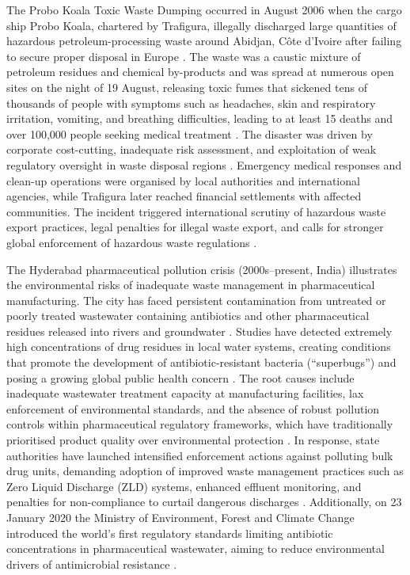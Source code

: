 The Probo Koala Toxic Waste Dumping occurred in August 2006 when the cargo ship Probo Koala, chartered by Trafigura, illegally discharged large quantities of hazardous petroleum-processing waste around Abidjan, C\^{o}te d'Ivoire after failing to secure proper disposal in Europe \cite{Amnesty_Trafigura}. The waste was a caustic mixture of petroleum residues and chemical by-products and was spread at numerous open sites on the night of 19 August, releasing toxic fumes that sickened tens of thousands of people with symptoms such as headaches, skin and respiratory irritation, vomiting, and breathing difficulties, leading to at least 15 deaths and over 100,000 people seeking medical treatment \cite{BBC_Trafigura, Amnesty_Trafigura}. The disaster was driven by corporate cost-cutting, inadequate risk assessment, and exploitation of weak regulatory oversight in waste disposal regions \cite{Amnesty_Trafigura, DOJ_EOIR}. Emergency medical responses and clean-up operations were organised by local authorities and international agencies, while Trafigura later reached financial settlements with affected communities. The incident triggered international scrutiny of hazardous waste export practices, legal penalties for illegal waste export, and calls for stronger global enforcement of hazardous waste regulations \cite{Amnesty_Trafigura, DOJ_EOIR}.

The Hyderabad pharmaceutical pollution crisis (2000s--present, India) illustrates the environmental risks of inadequate waste management in pharmaceutical manufacturing. The city has faced persistent contamination from untreated or poorly treated wastewater containing antibiotics and other pharmaceutical residues released into rivers and groundwater \cite{Nordea_Hyderabad}. Studies have detected extremely high concentrations of drug residues in local water systems, creating conditions that promote the development of antibiotic-resistant bacteria (``superbugs'') and posing a growing global public health concern \cite{TBIJ_Superbugs}. The root causes include inadequate wastewater treatment capacity at manufacturing facilities, lax enforcement of environmental standards, and the absence of robust pollution controls within pharmaceutical regulatory frameworks, which have traditionally prioritised product quality over environmental protection \cite{Nordea_Hyderabad, TBIJ_Superbugs}. In response, state authorities have launched intensified enforcement actions against polluting bulk drug units, demanding adoption of improved waste management practices such as Zero Liquid Discharge (ZLD) systems, enhanced effluent monitoring, and penalties for non-compliance to curtail dangerous discharges \cite{NIE_Telangana}. Additionally, on 23 January 2020 the Ministry of Environment, Forest and Climate Change introduced the world's first regulatory standards limiting antibiotic concentrations in pharmaceutical wastewater, aiming to reduce environmental drivers of antimicrobial resistance \cite{ReActGroup_India}.

